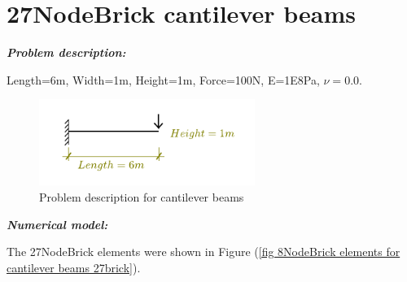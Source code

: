 \documentclass[fleqn,11pt,letter]{article}
\begin{document}

\thispagestyle{fancy}


\tableofcontents{}









\newpage

\section{27NodeBrick cantilever beams}
\vskip 24pt



\emph{\textbf{Problem description:}}

Length=6m, Width=1m, Height=1m, Force=100N, E=1E8Pa, $\nu=0.0$. 

\begin{figure}[H]
  \centering
  \includegraphics[width=7cm]{../Figure_files/4NodeANDES/cantilever_6.pdf}
  \caption{Problem description for cantilever beams}
  \label{fig Problem description for cantilever beams}
\end{figure}





\noindent \emph{\textbf{Numerical model:}}



The 27NodeBrick elements were shown in Figure (\ref{fig 8NodeBrick elements for cantilever beams 27brick}).
\end{document}
